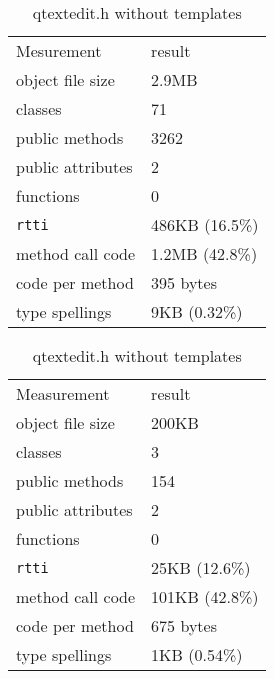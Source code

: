 \begin{table}[ht]
\begin{minipage}[b]{0.5\linewidth}
\centering
\caption{qtextedit.h with templates}
\label{tab:table1}
\begin{tabular}{ll}
\hline\noalign{\smallskip}
Mesurement & result\\
\noalign{\smallskip}
\hline
\noalign{\smallskip}
object file size & 2.9MB\\
classes & 71\\
public methods & 3262\\
public attributes & 2\\
functions & 0\\
\texttt{rtti} & 486KB (16.5\%)\\
method call code & 1.2MB (42.8\%)\\
code per method & 395 bytes\\
type spellings & 9KB (0.32\%)\\
\hline
\end{tabular}
\end{minipage}
\begin{minipage}[b]{0.5\linewidth}
\centering
\caption{qtextedit.h without templates}
\label{tab:table2}
\begin{tabular}{ll}
\hline\noalign{\smallskip}
Measurement & result\\
\noalign{\smallskip}
\hline
\noalign{\smallskip}
object file size & 200KB\\
classes & 3\\
public methods & 154\\
public attributes & 2\\
functions & 0\\
\texttt{rtti} & 25KB (12.6\%)\\
method call code & 101KB (42.8\%)\\
code per method & 675 bytes\\
type spellings & 1KB (0.54\%)\\
\hline
\end{tabular}
\end{minipage}
\end{table}
\noindent

